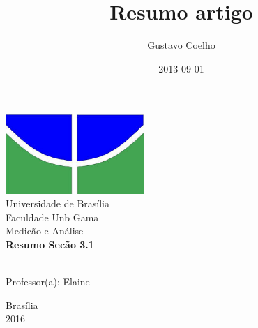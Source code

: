 \documentclass{article}
\title{Resumo artigo}
\date{2013-09-01}
\author{Gustavo Coelho}
\begin{document}
\begin{titlepage}
        \begin{center}
            \includegraphics[height=3cm]{logo.jpg}\\[0.3cm]
            {\large Universidade de Brasília}\\[0.2cm]
            {\large Faculdade Unb Gama}\\[0.2cm]
            {\large Medicão e Análise}\\[4.1cm]
            {\bf \huge Resumo Secão 3.1}\\[4.1cm]
        \end{center}
        \\[0.7cm]
        {\normalsize Professor(a): Elaine}
        \vfill
        \begin{center}
            {\large Brasília}\\[0.2cm]
            {\large 2016}
        \end{center}
\end{titlepage}
\end{document}
